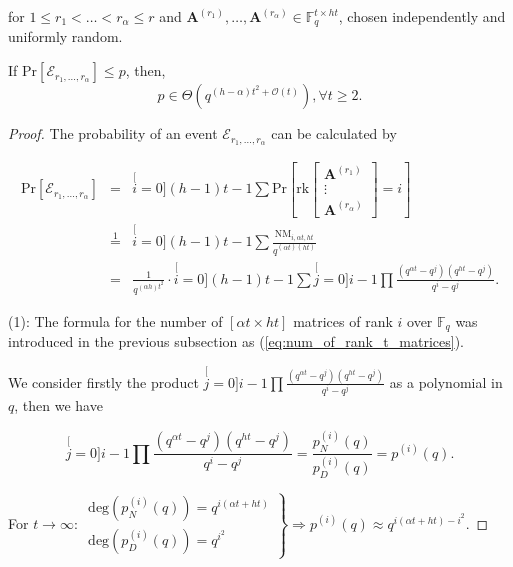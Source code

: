 for $1\leq r_{1}<\ldots<r_{\alpha}\leq r$ and $\boldsymbol{A}^{\left(r_{1}\right)},\ldots,\boldsymbol{A}^{\left(r_{\alpha}\right)}\in\ensuremath{\mathbb{F}}_{q}^{t\times ht}$,
chosen independently and uniformly random.
\begin{lem}
\label{lem:p_e1l1}If $\mathrm{Pr}\left[\mathcal{E}_{r_{1},\ldots,r_{\alpha}}\right]\leq p$,
then,
\[
p\in\Theta\left(q^{\left(h-\alpha\right)t^{2}+\mathcal{O}(t)}\right),\forall t\geq2.
\]
\end{lem}
\begin{proof}
The probability of an event $\mathcal{E}_{r_{1},\ldots,r_{\alpha}}$
can be calculated by 

\begin{eqnarray}
\mathrm{Pr}\left[\mathcal{E}_{r_{1},\ldots,r_{\alpha}}\right] & = & \stackrel[i=0]{(h-1)t-1}{\mathop{\sum}}\mathrm{Pr}\left[\mathrm{rk}\left[\begin{array}{c}
\boldsymbol{A}^{\left(r_{1}\right)}\\
\vdots\\
\boldsymbol{A}^{\left(r_{\alpha}\right)}
\end{array}\right]=i\right]\nonumber \\
 & \overset{1}{=} & \stackrel[i=0]{(h-1)t-1}{\mathop{\sum}}\frac{\mathrm{NM}_{i,\alpha t,ht}}{q^{\left(\alpha t\right)\left(ht\right)}}\nonumber \\
 & = & \frac{1}{q^{\left(\alpha h\right)t^{2}}}\cdot\stackrel[i=0]{(h-1)t-1}{\mathop{\sum}}\stackrel[j=0]{i-1}{\mathop{\prod}}\frac{\left(q^{\alpha t}-q^{j}\right)\left(q^{ht}-q^{j}\right)}{q^{i}-q^{j}}.\label{eq:general_nw_calc_p}
\end{eqnarray}

(1): The formula for the number of $\left[\alpha t\times ht\right]$
matrices of rank $i$ over $\ensuremath{\mathbb{F}}_{q}$ was introduced
in the previous subsection as (\ref{eq:num_of_rank_t_matrices}).

We consider firstly the product $\stackrel[j=0]{i-1}{\mathop{\prod}}\frac{\left(q^{\alpha t}-q^{j}\right)\left(q^{ht}-q^{j}\right)}{q^{i}-q^{j}}$
as a polynomial in $q$, then we have

\[
\stackrel[j=0]{i-1}{\mathop{\prod}}\frac{\left(q^{\alpha t}-q^{j}\right)\left(q^{ht}-q^{j}\right)}{q^{i}-q^{j}}=\frac{p_{N}^{(i)}(q)}{p_{D}^{(i)}(q)}=p^{(i)}(q).
\]

For $t\rightarrow\infty$: $\left.\begin{array}{c}
\mathrm{deg}\left(p_{N}^{(i)}(q)\right)=q^{i(\alpha t+ht)}\\
\mathrm{deg}\left(p_{D}^{(i)}(q)\right)=q^{i^{2}}
\end{array}\right\} \Rightarrow p^{(i)}(q)\approx q^{i(\alpha t+ht)-i^{2}}.$


\end{proof}
